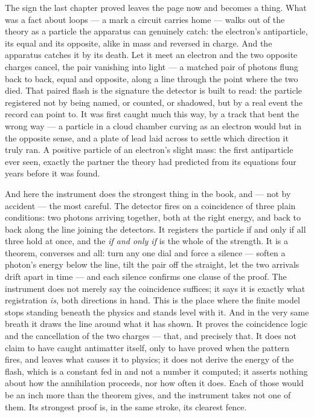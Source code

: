 The sign the last chapter proved leaves the page now and becomes a thing. What was a fact about loops --- a mark
a circuit carries home --- walks out of the theory as a particle the apparatus can genuinely catch: the
electron's antiparticle, its equal and its opposite, alike in mass and reversed in charge. And the apparatus
catches it by its death. Let it meet an electron and the two opposite charges cancel, the pair vanishing into
light --- a matched pair of photons flung back to back, equal and opposite, along a line through the point where
the two died. That paired flash is the signature the detector is built to read: the particle registered not by
being named, or counted, or shadowed, but by a real event the record can point to. It was first caught much this
way, by a track that bent the wrong way --- a particle in a cloud chamber curving as an electron would but in
the opposite sense, and a plate of lead laid across to settle which direction it truly ran. A positive particle
of an electron's slight mass: the first antiparticle ever seen, exactly the partner the theory had predicted
from its equations four years before it was found.

And here the instrument does the strongest thing in the book, and --- not by accident --- the most careful. The
detector fires on a coincidence of three plain conditions: two photons arriving together, both at the right
energy, and back to back along the line joining the detectors. It registers the particle if and only if all
three hold at once, and the \emph{if and only if} is the whole of the strength. It is a theorem, converses and
all: turn any one dial and force a silence --- soften a photon's energy below the line, tilt the pair off the
straight, let the two arrivals drift apart in time --- and each silence confirms one clause of the proof. The
instrument does not merely say the coincidence suffices; it says it is exactly what registration \emph{is}, both
directions in hand. This is the place where the finite model stops standing beneath the physics and stands level
with it. And in the very same breath it draws the line around what it has shown. It proves the coincidence logic
and the cancellation of the two charges --- that, and precisely that. It does not claim to have caught
antimatter itself, only to have proved when the pattern fires, and leaves what causes it to physics; it does not
derive the energy of the flash, which is a constant fed in and not a number it computed; it asserts nothing
about how the annihilation proceeds, nor how often it does. Each of those would be an inch more than the theorem
gives, and the instrument takes not one of them. Its strongest proof is, in the same stroke, its clearest fence.

